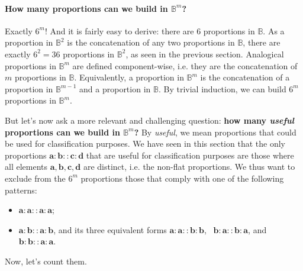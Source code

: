 \paragraph{How many proportions can we build in $\mathbb{B}^m$?\\}
\label{SEC:number_of_parallelograms_in_Bm}

Exactly $6^m$! And it is fairly easy to derive: there are $6$ proportions in
$\mathbb{B}$. As a proportion in $\mathbb{B}^2$ is the concatenation of any two
proportions in $\mathbb{B}$, there are exactly $6^2 = 36$ proportions in
$\mathbb{B}^2$, as seen in the previous section. Analogical proportions in
$\mathbb{B}^m$ are defined component-wise, i.e. they are the concatenation of
$m$ proportions in $\mathbb{B}$. Equivalently, a proportion in $\mathbb{B}^m$
is the concatenation of a proportion in $\mathbb{B}^{m - 1}$ and a proportion
in $\mathbb{B}$. By trivial induction, we can build $6^m$ proportions in
$\mathbb{B}^m$.

But let's now ask a more relevant and challenging question: \textbf{how many
\textit{useful} proportions can we build in $\mathbb{B}^m$?} By
\textit{useful}, we mean proportions that could be used for classification
purposes.  We have seen in this section that the only proportions
$\mathbf{a} : \mathbf{b} :: \mathbf{c} : \mathbf{d}$ that are useful for
classification purposes are those where all elements $\mathbf{a}, \mathbf{b},
\mathbf{c}, \mathbf{d}$ are distinct, i.e. the non-flat proportions. We thus
want to exclude from the $6^m$ proportions those that comply with one of the
following patterns:

\begin{itemize}
  \item $\mathbf{a}: \mathbf{a} :: \mathbf{a} : \mathbf{a}$;
  \item $\mathbf{a}: \mathbf{b} :: \mathbf{a} : \mathbf{b}$, and its three
    equivalent forms $\mathbf{a}: \mathbf{a} :: \mathbf{b} : \mathbf{b}$,~
    $\mathbf{b}: \mathbf{a} :: \mathbf{b} : \mathbf{a}$, and $\mathbf{b}:
    \mathbf{b} :: \mathbf{a} : \mathbf{a}$.
\end{itemize}

Now, let's count them.

